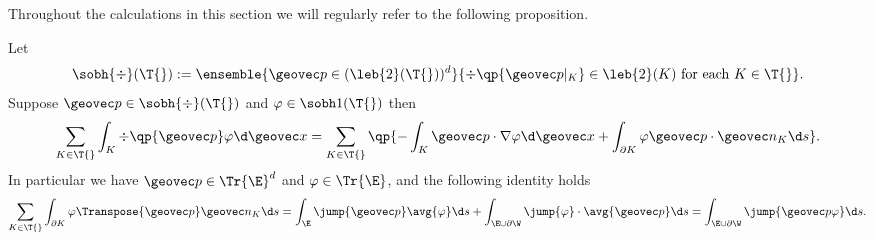 \documentclass[final]{amsart}
\numberwithin{equation}{section}
\begin{document}
Throughout the calculations in this section we will regularly refer to
the following proposition.
\begin{Pro}
  \label{Pro:trace-jump-avg}
{
  Let 
  \begin{equation}
  \sobh{\div}(\T{}) 
  := 
  \ensemble{\geovec p \in(\leb{2}(\T{}))^d}{\div\qp{\geovec p|_K} \in \leb{2}(K) \text{ for each } K \in \T{}}.
  \end{equation}
}
  Suppose $\geovec p 
  \in \sobh{\div}(\T{})$
  and $\varphi\in\sobh1(\T{})$ then 
  \begin{equation}
    \begin{split}
      \sum_{K\in\T{}}
      \int_K \div\qp{\geovec p} \varphi \d \geovec x
      =
      \sum_{K\in\T{}}
      \qp{
        -
        \int_K
        \geovec p \cdot \nabla \varphi \d \geovec x
        +
        \int_{\partial K}
        \varphi \geovec p \cdot \geovec n_K \d s
        }.
    \end{split}
  \end{equation}
  In particular we have $\geovec p \in \Tr{\E}^d$ and $\varphi \in
  \Tr{\E}$, and the following identity holds
  \begin{equation}
    \sum_{K\in\T{}}
    \int_{\partial K}
    \varphi \Transpose{{\geovec p}}
    \geovec n_K \d s
    =
    \int_\E 
    \jump{\geovec p} 
    \avg{\varphi}
    \d s
    +
    \int_{\E\cup\partial\W}
    \jump{\varphi}\cdot
    \avg{\geovec p}
    \d s
    =
    \int_{\E\cup\partial\W}
    \jump{\geovec p \varphi}
    \d s.
  \end{equation}
\end{Pro}
\end{document}
